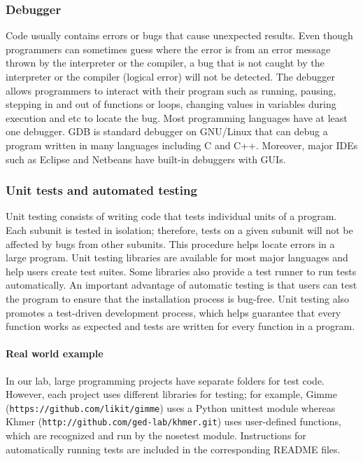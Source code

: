 \documentclass[ChapterTOCs,krantz2]{krantz} %
\begin{document}
\subsubsection{Debugger}

Code usually contains errors or bugs that cause unexpected results.
Even though programmers can sometimes guess where the error is from an error message
thrown by the interpreter or the compiler, a bug that is not caught by the
interpreter or the compiler (logical error) will not be detected.
The debugger allows programmers to interact with their program such as
running, pausing, stepping in and out of functions or loops, changing values
in variables during execution and etc to locate the bug.
Most programming languages have at least one debugger.
GDB is standard debugger on GNU/Linux that can debug a program written in many
languages including C and C++.
Moreover, major IDEs such as Eclipse and Netbeans have built-in debuggers
with GUIs. 

\subsubsection{Unit tests and automated testing}

Unit testing consists of writing
code that tests individual units of a program. 
Each subunit is tested in isolation; therefore, tests 
on a given subunit will not be affected by bugs from other subunits. This
procedure helps locate errors in a large program. 
Unit testing libraries are available for most major languages
and help users create test
suites. Some libraries also
provide a test runner to run tests automatically. An important
advantage of automatic testing is that users can
test the program to ensure that the installation process is bug-free.  Unit
testing also promotes a test-driven development process, which 
helps guarantee that
every function works as expected and tests are written for every function in a
program.

\paragraph{Real world example}

In our lab,
large programming projects have separate folders for test code. However, each project uses
different libraries for testing; for example, Gimme
(\texttt{https://github.com/likit/gimme}) uses a Python unittest module whereas Khmer
(\texttt{http://github.com/ged-lab/khmer.git}) uses user-defined functions, which are
recognized and run by the nosetest module. Instructions for automatically
running tests are included in the corresponding README
files.
\end{document}
